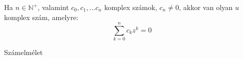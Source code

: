 \begin{frame}
\begin{tcolorbox}[title={Def.: Komplex számok}]
\end{tcolorbox}

\begin{tcolorbox}[title={Ész}]
\end{tcolorbox}

\begin{tcolorbox}[title={Alakok}]
\end{tcolorbox}

\begin{tcolorbox}[title={Ész}]
\end{tcolorbox}
\end{frame}

\begin{frame}
\begin{tcolorbox}[title={Def.: Moivre azonosságok}]
\end{tcolorbox}

\begin{tcolorbox}[title={Def.: Gyökvonás komplex számokból}]
\end{tcolorbox}

\begin{tcolorbox}[title={Def.: $n$-edik primitív egységgyökök}]
\end{tcolorbox}
\end{frame}

\begin{frame}
\begin{tcolorbox}[title={Tétel: Az algebra alaptétele}]
Ha $n \in \mathbb{N}^+$, valamint $c_0, c_1, ... c_n$ komplex számok, $c_n \neq 0$, akkor van olyan $u$ komplex szám, amelyre:\\
$$\sum_{k = 0}^n c_kz^k = 0$$
\end{tcolorbox}
\end{frame}

\begin{frame}[plain]
\begin{tcolorbox}[center, colback={myyellow}, coltext={black}, colframe={myyellow}]
    {\Huge Számelmélet}
    \mmedskip
\end{tcolorbox}
\end{frame}

\begin{frame}
\begin{tcolorbox}[title={Oszthatóság egységelemes integritási tarományban (Emlékeztető)}]
\end{tcolorbox}
\end{frame}

